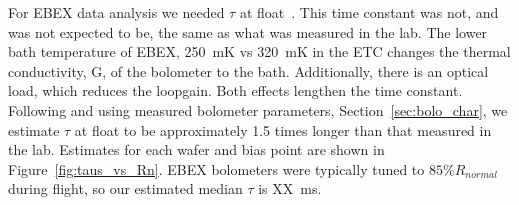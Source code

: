 \documentclass[../EBEXPaper2.tex]{subfiles}
\begin{document}
For \ac{EBEX} data analysis we needed $\tau$ at float~\citep{EP1}.  This time constant was not, and was not expected to be, the 
same as what was measured in the lab.  The lower bath temperature of \ac{EBEX}, 250~mK vs 320~mK in the \ac{ETC} changes the 
thermal conductivity, G, of the bolometer to the bath.  Additionally, there is an optical load, which reduces the loopgain. 
Both effects lengthen the time constant.  Following \citet{Hannes_thesis} and using measured bolometer parameters, 
Section~\ref{sec:bolo_char}, we estimate $\tau$ at float to be approximately 1.5 times longer than that measured in the lab. 
Estimates for each wafer and bias point are shown in Figure~\ref{fig:taus_vs_Rn}.  \ac{EBEX} bolometers were typically tuned 
to $85\% R_{normal}$ during flight, so our estimated median $\tau$ is XX~ms.









%
\end{document}
